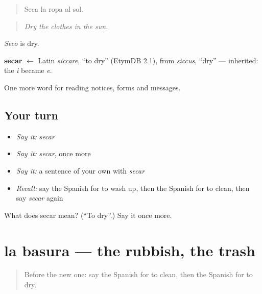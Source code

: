 \begin{quote}
Seca la ropa al sol.
\end{quote}

\begin{quote}
\emph{Dry the clothes in the sun.}
\end{quote}

\emph{Seco} is dry.

\begin{cousinweb}
\textbf{secar} $\leftarrow$ Latin \emph{siccare}, \textquotedblleft{}to dry\textquotedblright{} (EtymDB 2.1), from \emph{siccus}, \textquotedblleft{}dry\textquotedblright{} — inherited: the \emph{i} became \emph{e}.
\end{cousinweb}

\begin{grammarlens}[title={What you've built}]
One more word for reading notices, forms and messages.
\end{grammarlens}

\subsection*{Your turn}
\begin{itemize}
\raggedright
  \item \emph{Say it:} \emph{secar}
  \item \emph{Say it:} \emph{secar}, once more
  \item \emph{Say it:} a sentence of your own with \emph{secar}
  \item \emph{Recall:} say the Spanish for to wash up, then the Spanish for to clean, then say \emph{secar} again
\end{itemize}

\begin{tcolorbox}[breakable,colback=teal!4,colframe=teal!35!black,title={Before you move on}]
What does secar mean? (\textquotedblleft{}To dry\textquotedblright{}.) Say it once more.
\end{tcolorbox}
\section[la basura]{la basura — the rubbish, the trash}

\label{lesson:ES-C485-basura}



\begin{quote}
Before the new one: say the Spanish for to clean, then the Spanish for to dry.
\end{quote}

